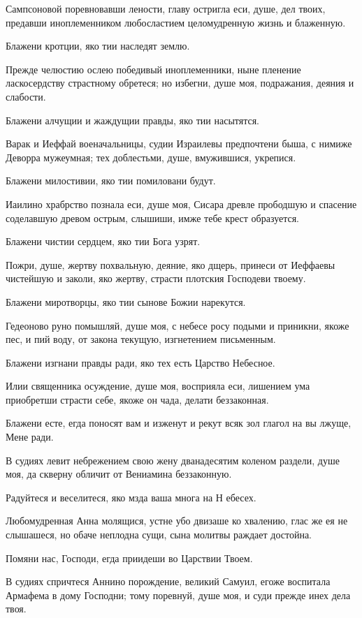 Сампсоновой поревновавши лености, главу остригла еси, душе, дел твоих, предавши иноплеменником любосластием целомудренную жизнь и блаженную.

Блажени кротции, яко тии наследят землю.

Прежде челюстию ослею победивый иноплеменники, ныне пленение ласкосердству страстному обретеся; но избегни, душе моя, подражания, деяния и слабости.

Блажени алчущии и жаждущии правды, яко тии насытятся.

Варак и Иеффай военачальницы, судии Израилевы предпочтени быша, с нимиже Деворра мужеумная; тех доблестьми, душе, вмужившися, укрепися.

Блажени милостивии, яко тии помиловани будут.

Иаилино храбрство познала еси, душе моя, Сисара древле прободшую и спасение соделавшую древом острым, слышиши, имже тебе крест образуется.

Блажени чистии сердцем, яко тии Бога узрят.

Пожри, душе, жертву похвальную, деяние, яко дщерь, принеси от Иеффаевы чистейшую и заколи, яко жертву, страсти плотския Господеви твоему.

Блажени миротворцы, яко тии сынове Божии нарекутся.

Гедеоново руно помышляй, душе моя, с небесе росу подыми и приникни, якоже пес, и пий воду, от закона текущую, изгнетением письменным.

Блажени изгнани правды ради, яко тех есть Царство Небесное.

Илии священника осуждение, душе моя, восприяла еси, лишением ума приобретши страсти себе, якоже он чада, делати беззаконная.

Блажени есте, егда поносят вам и изженут и рекут всяк зол глагол на вы лжуще, Мене ради.

В судиях левит небрежением свою жену дванадесятим коленом раздели, душе моя, да скверну обличит от Вениамина беззаконную.

Радуйтеся и веселитеся, яко мзда ваша многа на Н ебесех.

Любомудренная Анна молящися, устне убо двизаше ко хвалению, глас же ея не слышашеся, но обаче неплодна сущи, сына молитвы раждает достойна.

Помяни нас, Господи, егда приидеши во Царствии Твоем.

В судиях спричтеся Аннино порождение, великий Самуил, егоже воспитала Армафема в дому Господни; тому поревнуй, душе моя, и суди прежде инех дела твоя.

